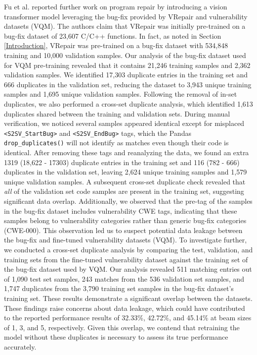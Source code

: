 Fu et al.\cite{fu2024vision} reported further work on program repair by introducing a vision transformer model leveraging the bug-fix provided by VRepair\cite{chen2022neural} and vulnerability datasets (VQM).
The authors claim that VRepair was initially pre-trained on a bug-fix dataset of 23,607 C/C++ functions.
In fact, as noted in Section \ref{Introduction}, VRepair was pre-trained on a bug-fix dataset with 534,848 training and 10,000 validation samples\cite{chen2022neural}.
Our analysis of the bug-fix dataset\cite{vqm2024} used for VQM pre-training revealed that it contains 21,246 training samples and 2,362 validation samples.
We identified 17,303 duplicate entries in the training set and 666 duplicates in the validation set, reducing the dataset to 3,943 unique training samples and 1,695 unique validation samples.
Following the removal of in-set duplicates, we also performed a cross-set duplicate analysis, which identified 1,613 duplicates shared between the training and validation sets.
During manual verification, we noticed several samples appeared identical except for misplaced \texttt{<S2SV\_StartBug>} and \texttt{<S2SV\_EndBug>} tags, which the Pandas \texttt{drop\_duplicates()} will not identify as matches even though their code is identical.
After removing these tags and reanalyzing the data, we found an extra 1319 (18,622 - 17303) duplicate entries in the training set and 116 (782 - 666) duplicates in the validation set, leaving 2,624 unique training samples and 1,579 unique validation samples.
A subsequent cross-set duplicate check revealed that \emph{all} of the validation set code samples are present in the training set, suggesting significant data overlap.
Additionally, we observed that the pre-tag of the samples in the bug-fix dataset includes vulnerability CWE tags, indicating that these samples belong to vulnerability categories rather than generic bug-fix categories (CWE-000).
This observation led us to suspect potential data leakage between the bug-fix and fine-tuned vulnerability datasets (VQM).
To investigate further, we conducted a cross-set duplicate analysis by comparing the test, validation, and training sets from the fine-tuned vulnerability dataset against the training set of the bug-fix dataset used by VQM.
Our analysis revealed 511 matching entries out of 1,090 test set samples, 243 matches from the 536 validation set samples, and 1,747 duplicates from the 3,790 training set samples in the bug-fix dataset's training set.
These results demonstrate a significant overlap between the datasets.
These findings raise concerns about data leakage, which could have contributed to the reported performance results of 32.33\%, 42.72\%, and 45.14\% at beam sizes of 1, 3, and 5, respectively.
Given this overlap, we contend that retraining the model without these duplicates is necessary to assess its true performance accurately.

